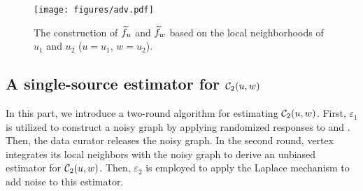 
\begin{figure}[thb]
\centering  
\texttt{[image: figures/adv.pdf]}
\myspace
\caption{
The construction of $\widetilde{f}_u$ and $\widetilde{f}_w$ based on the local neighborhoods of $u_1$ and $u_2$ ($u = u_1$, $w = u_2$).
}
\myspace
\myspace
\label{fig:adv}
\end{figure}

\subsection{A single-source estimator for $\mathcal{C}_2(u,w)$} 
In this part, we introduce a two-round algorithm for estimating $\mathcal{C}_2(u,w)$. 
First, $\varepsilon_1$ is utilized to construct a noisy graph by applying randomized responses to \vq and \vx. 
Then, the data curator releases the noisy graph. In the second round, vertex \vq integrates its local neighbors with the noisy graph to derive an unbiased estimator for $\mathcal{C}_2(u,w)$. Then, $\varepsilon_2$ is employed to apply the Laplace mechanism to add noise to this estimator. 

